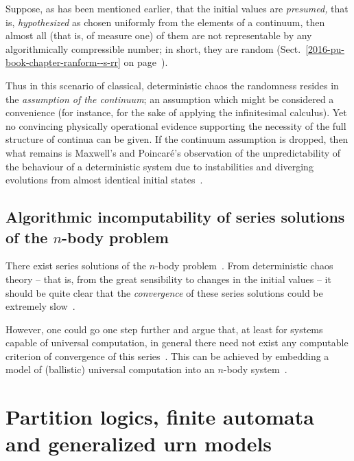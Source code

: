 Suppose, as has been mentioned earlier, that the initial values are {\em presumed,}
that is,  {\em hypothesized} as
chosen uniformly from the elements of
a continuum, then almost all (that is, of measure one) of them
are not representable by any algorithmically compressible number;
in short,  they are random (Sect.~\ref{2016-pu-book-chapter-ranform--s-rr}
on page~\pageref{2016-pu-book-chapter-ranform--s-rr}).


Thus in this scenario of classical, deterministic chaos the randomness resides
in the {\em assumption of the continuum};
an assumption which might be considered a convenience (for instance, for the sake of applying the infinitesimal calculus).
Yet no convincing
physically operational evidence supporting the necessity of the full structure of continua can be given.
If the continuum assumption is dropped, then what remains is Maxwell's
and Poincar{\'e}'s observation of the unpredictability
of the behaviour of a deterministic system
due to instabilities and diverging evolutions from almost identical initial states~\cite{Lyapunov-92}.


\section{Algorithmic incomputability of series solutions of the $n$-body problem}


There exist series solutions of the $n$-body problem~\cite{Sundman12,Wang91,Wang01}.
From deterministic chaos theory -- that is, from the great sensibility to changes in the initial values --
it should be quite clear that the {\em convergence} of these series solutions
could be extremely slow~\cite{Diacu96,Diacu96-ce}.

However, one could go one step further and argue that, at least for systems capable of universal computation,
in general there need not exist any computable criterion of convergence of this series~\cite{Specker49}.
This can be achieved by embedding a model of (ballistic) universal computation into an $n$-body system~\cite{svozil-2007-cestial}.







\chapter{Partition logics, finite automata and generalized urn models}
\label{2016-pu-book-chapter-fagum} %

